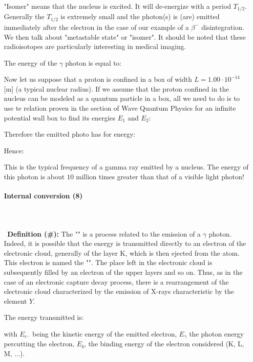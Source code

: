 	\begin{tcolorbox}[title=Remark,colframe=black,arc=10pt]
	"Isomer" means that the nucleus is excited. It will de-energize with a period $T_{1/2}$. Generally the $T_{1/2}$ is extremely small and the photon(s) is (are) emitted immediately after the electron in the case of our example of a $\beta^{-}$ disintegration. We then talk about "metastable state" or "isomer". It should be noted that these radioisotopes are particularly interesting in medical imaging.
	\end{tcolorbox}
	The energy of the $\gamma$ photon is equal to:
	
	Now let us suppose that a proton is confined in a box of width $L = 1.00\cdot 10^{-14}$ [m] (a typical nuclear radius). If we assume that the proton confined in the nucleus can be modeled as a quantum particle in a box, all we need to do is to use te relation proven in the section of Wave Quantum Physics for an infinite potential wall box to find its energies $E_1$ and $E_2$:
	
	Therefore the emitted photo has for energy:
	
	Hence:
	
	This is the typical frequency of a gamma ray emitted by a nucleus. The energy of this photon is about $10$ million times greater than that of a visible light photon!
	
	\paragraph{Internal conversion (8)}\mbox{}\\\\\
	\textbf{Definition (\#\mydef):} The  "" is a process related to the emission of a $\gamma$ photon. Indeed, it is possible that the energy is transmitted directly to an electron of the electronic cloud, generally of the layer K, which is then ejected from the atom. This electron is named the "". The place left in the electronic cloud is subsequently filled by an electron of the upper layers and so on. Thus, as in the case of an electronic capture decay process, there is a rearrangement of the electronic cloud characterized by the emission of X-rays characteristic by the element $Y$.

	The energy transmitted is:
	
	with $E_{e^{-}}$ being the kinetic energy of the emitted electron, $E_\gamma$ the photon energy percutting the electron, $E_b$, the binding energy of the electron considered (K, L, M, ...).
	
